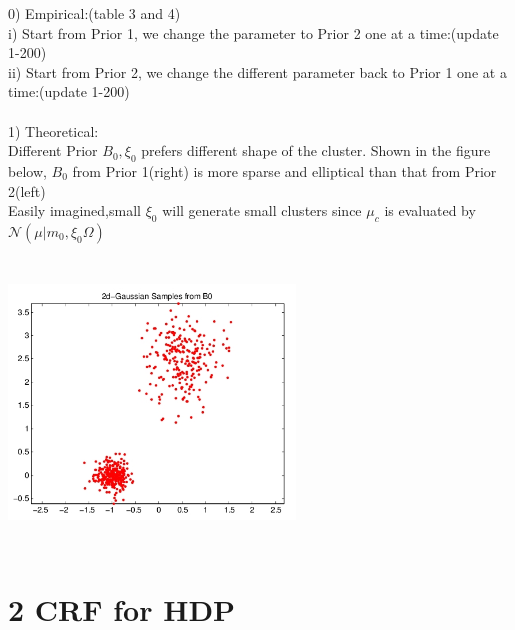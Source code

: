 \documentclass{article}
\begin{document}
\begin{spacing}{1.1}
\begin{center}
\begin{table}[t]
\end{table}
\end{center}
0) Empirical:(table 3 and 4)\\
i) Start from Prior 1, we change the parameter to Prior 2 one at a time:(update 1-200)\\ 
ii) Start from Prior 2, we change the different parameter back to Prior 1 one at a time:(update 1-200)\\ \\
1) Theoretical:\\
Different Prior $B_{0},\xi_{0}$ prefers different shape of the cluster.
Shown in the figure below, $B_{0}$ from Prior 1(right) is more sparse and elliptical than that from Prior 2(left)\\ 
Easily imagined,small $\xi_{0}$ will generate small clusters since $\mu_{c}$ is evaluated by $\mathcal{N}(\mu|m_{0},\xi_{0}\Omega)$\\
\begin{center}
\includegraphics[width=3in,height=3in]{sample.jpg} \\
\end{center}

\section{2 CRF for HDP}

\end{spacing}
\end{document}
